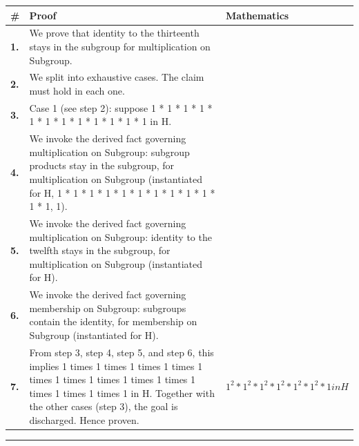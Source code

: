 \documentclass[11pt]{article}
\theoremstyle{definition}
\begin{document}
\begin{tabular}{@{} >{\raggedright\arraybackslash}p{} >{\raggedright\arraybackslash}p{} >{\raggedleft\arraybackslash}p{} @{}}
\textbf{\#} & \textbf{Proof} & \textbf{Mathematics} \\
\midrule
\textbf{1.} & We prove that identity to the thirteenth stays in the subgroup for multiplication on Subgroup. & \\[0.45em]
\textbf{2.} & We split into exhaustive cases. The claim must hold in each one. & \\[0.45em]
\textbf{3.} & Case 1 (see step 2): suppose 1 * 1 * 1 * 1 * 1 * 1 * 1 * 1 * 1 * 1 * 1 * 1 in H. & \\[0.45em]
\textbf{4.} & We invoke the derived fact governing multiplication on Subgroup: subgroup products stay in the subgroup, for multiplication on Subgroup (instantiated for H, 1 * 1 * 1 * 1 * 1 * 1 * 1 * 1 * 1 * 1 * 1 * 1, 1). & \\[0.45em]
\textbf{5.} & We invoke the derived fact governing multiplication on Subgroup: identity to the twelfth stays in the subgroup, for multiplication on Subgroup (instantiated for H). & \\[0.45em]
\textbf{6.} & We invoke the derived fact governing membership on Subgroup: subgroups contain the identity, for membership on Subgroup (instantiated for H). & \\[0.45em]
\textbf{7.} & From step 3, step 4, step 5, and step 6, this implies 1 times 1 times 1 times 1 times 1 times 1 times 1 times 1 times 1 times 1 times 1 times 1 times 1 in H. Together with the other cases (step 3), the goal is discharged. Hence proven. & $\displaystyle 1^{2} * 1^{2} * 1^{2} * 1^{2} * 1^{2} * 1^{2} * 1 in H$ \\[0.45em]
\bottomrule
\end{tabular}
\label{thm:Subgroup-multiplication-identity_to_the_thirteenth_stays_in_the_subgroup}
\par\medskip\hrule
\end{document}
